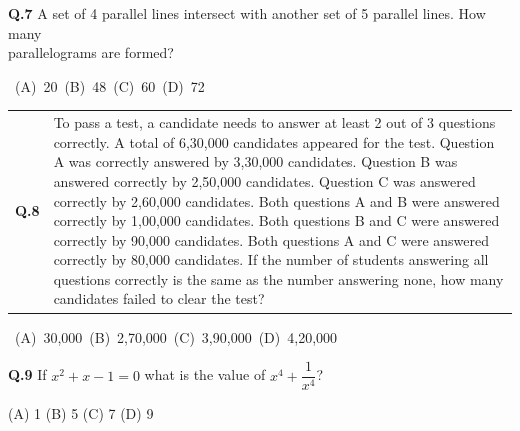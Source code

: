 \documentclass{article}
\begin{document}
\vspace{0.1em}
\noindent
\textbf{Q.7} \quad A set of 4 parallel lines intersect with another set of 5 parallel lines. How many\\
\hspace*{3.2em} parallelograms are formed?

\vspace{0.5cm}

\mbox{ \hspace{1cm} (A) 20 
\hspace { 2 cm } (B) 48 
\hspace { 2 cm } (C) 60 
\hspace { 2 cm } (D) 72 }\\
\vspace{0.3cm}

\noindent
\begin{tabular}
{@{}ll}
\hspace{0cm} \textbf{Q.8}  &  \parbox[t]{0.85\textwidth}{To pass a test, a candidate needs to answer at least 2 out of 3 questions correctly. A total of 6,30,000 candidates appeared for the test. Question A was correctly answered by 3,30,000 candidates. Question B was answered correctly by 2,50,000 candidates. Question C was answered correctly by 2,60,000 candidates. Both questions A and B were answered correctly by 1,00,000 candidates. Both questions B and C were answered correctly by 90,000 candidates. Both questions A and C were answered correctly by 80,000 candidates. If the number of students answering all questions correctly is the same as the number answering none, how many candidates failed to clear the test?}
      
\end{tabular}

 \vspace{0.9cm} 
  \mbox{ \hspace{0.4cm} (A) 30,000
  \hspace{2cm} (B) 2,70,000
  \hspace{2cm} (C) 3,90,000
 \hspace{2cm} (D) 4,20,000 }

\vspace{0.3cm}
 
 \noindent\textbf{Q.9} \hspace{0.5cm}
If $x^2 + x - 1 = 0$ what is the value of $x^4 + \dfrac{1}{x^4}$?

\vspace{0.7cm}

\noindent
\hspace{1.4cm}(A) 1 \hspace{2.5cm} (B) 5 \hspace{2.5cm} (C) 7 \hspace{2.5cm} (D) 9
\end{document}
